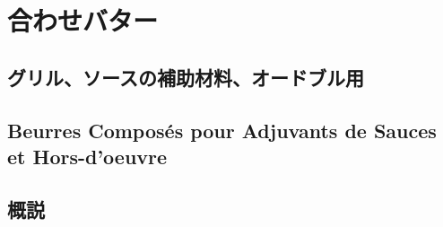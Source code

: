 \hypertarget{ux5408ux308fux305bux30d0ux30bfux30fc}{%
\section{合わせバター}\label{ux5408ux308fux305bux30d0ux30bfux30fc}}

\vspace{0\zw}

\hypertarget{ux30b0ux30eaux30ebux30bdux30fcux30b9ux306eux88dcux52a9ux6750ux6599ux30aaux30fcux30c9ux30d6ux30ebux7528}{%
\subsection{グリル、ソースの補助材料、オードブル用}\label{ux30b0ux30eaux30ebux30bdux30fcux30b9ux306eux88dcux52a9ux6750ux6599ux30aaux30fcux30c9ux30d6ux30ebux7528}}

\vspace*{-1.5\zw}

\hypertarget{beurres-composuxe9s-pour-adjuvants-de-sauces-et-hors-doeuvre}{%
\subsection{Beurres Composés pour Adjuvants de Sauces et
Hors-d'oeuvre}\label{beurres-composuxe9s-pour-adjuvants-de-sauces-et-hors-doeuvre}}

 

\hypertarget{observation-sur-les-beurres-composes}{%
\subsection{概説}\label{observation-sur-les-beurres-composes}}

